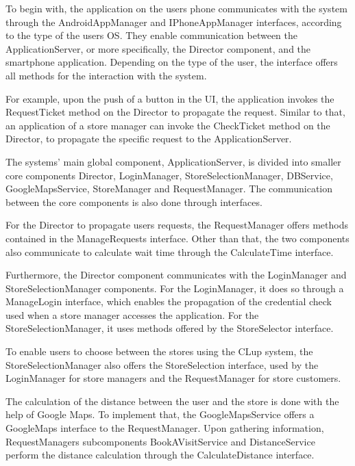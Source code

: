 To begin with, the application on the users phone communicates with the system through the AndroidAppManager and IPhoneAppManager interfaces, according to the type of the users OS. They enable communication between the ApplicationServer, or more specifically, the Director component, and the smartphone application. Depending on the type of the user, the interface offers all methods for the interaction with the system. 

For example, upon the push of a button in the UI, the application invokes the RequestTicket method on the Director to propagate the request. Similar to that, an application of a store manager can invoke the CheckTicket method on the Director, to propagate the specific request to the ApplicationServer. \newline
 

The systems' main global component, ApplicationServer, is divided into smaller core components Director, LoginManager, StoreSelectionManager, DBService, GoogleMapsService, StoreManager and RequestManager. The communication between the core components is also done through interfaces. 

For the Director to propagate users requests, the RequestManager offers methods contained in the ManageRequests interface. Other than that, the two components also communicate to calculate wait time through the CalculateTime interface. 

Furthermore, the Director component communicates with the LoginManager and StoreSelectionManager components. For the LoginManager, it does so through a ManageLogin interface, which enables the propagation of the credential check used when a store manager accesses the application. For the StoreSelectionManager, it uses methods offered by the StoreSelector interface. \newline

To enable users to choose between the stores using the CLup system, the StoreSelectionManager also offers the StoreSelection interface, used by the LoginManager for store managers and the RequestManager for store customers. 

The calculation of the distance between the user and the store is done with the help of Google Maps. To implement that, the GoogleMapsService offers a GoogleMaps interface to the RequestManager. Upon gathering information, RequestManagers subcomponents BookAVisitService and DistanceService perform the distance calculation through the CalculateDistance interface. \newline

